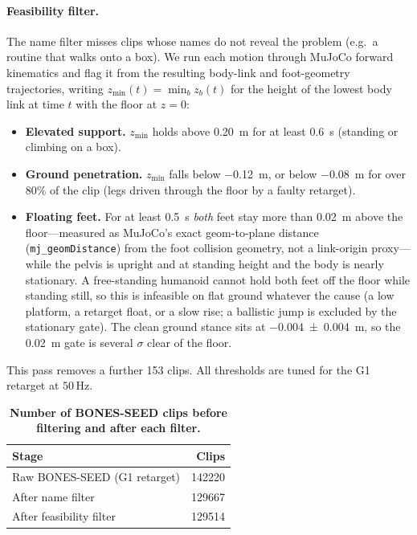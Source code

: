 \paragraph{Feasibility filter.}
The name filter misses clips whose names do not reveal the problem (e.g.\ a
routine that walks onto a box). We run each motion through MuJoCo forward
kinematics and flag it from the resulting body-link and foot-geometry trajectories, writing
$z_{\min}(t)=\min_b z_b(t)$ for the height of the lowest body link at time $t$ with the floor at
$z=0$:
\begin{itemize}
  \item \textbf{Elevated support.} $z_{\min}$ holds above \qty{0.20}{\metre} for at
  least \qty{0.6}{\second} (standing or climbing on a box).
  \item \textbf{Ground penetration.} $z_{\min}$ falls below \qty{-0.12}{\metre}, or
  below \qty{-0.08}{\metre} for over 80\% of the clip (legs driven through the
  floor by a faulty retarget).
  \item \textbf{Floating feet.} For at least \qty{0.5}{\second} \emph{both} feet
  stay more than \qty{0.02}{\metre} above the floor---measured as MuJoCo's exact
  geom-to-plane distance (\texttt{mj\_geomDistance}) from the foot collision
  geometry, not a link-origin proxy---while the pelvis is upright and at standing
  height and the body is nearly stationary. A free-standing humanoid cannot hold
  both feet off the floor while standing still, so this is infeasible on flat
  ground whatever the cause (a low platform, a retarget float, or a slow rise; a
  ballistic jump is excluded by the stationary gate). The clean ground stance
  sits at \qty{-0.004 \pm 0.004}{\metre}, so the \qty{0.02}{\metre} gate is several
  $\sigma$ clear of the floor.
\end{itemize}
This pass removes a further 153 clips. All thresholds are tuned for the G1
retarget at $50\,\mathrm{Hz}$.

\begin{table}[t]
\centering
\begin{tabular}{lr}
\toprule
\textbf{Stage} & \textbf{Clips} \\
\midrule
Raw BONES-SEED (G1 retarget) & \num{142220} \\
After name filter & \num{129667} \\
After feasibility filter & \num{129514} \\
\bottomrule
\end{tabular}
\vspace{0.6em}
\caption{\textbf{Number of BONES-SEED clips before filtering and after each filter.}}
\label{tab:data-filter}
\end{table}

